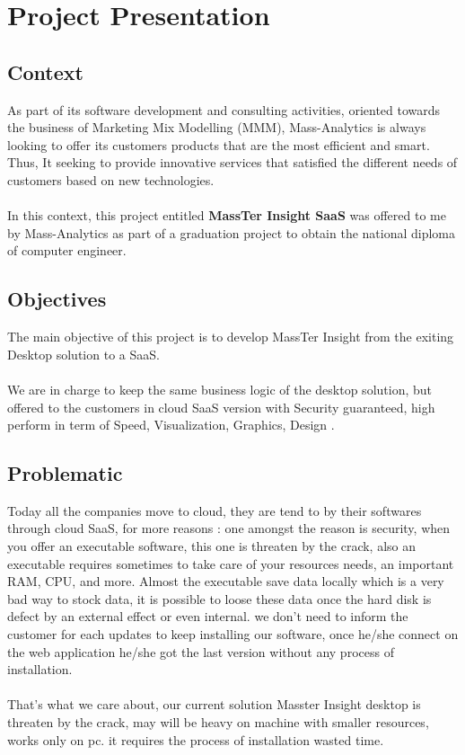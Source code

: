 	\section{Project Presentation}
	
	\subsection{Context}
	As part of its software development and consulting activities, oriented towards the business of Marketing Mix Modelling (MMM), Mass-Analytics is always looking to offer its customers products that are the most efficient and smart. Thus, It seeking to provide innovative services that satisfied the different needs of customers based on new technologies.
	\\
	\\
	In this context, this project entitled \textbf{MassTer Insight SaaS} was offered to me by Mass-Analytics as part of a graduation project to obtain the national diploma of computer engineer.      
	\subsection{Objectives}
	The main objective of this project is to develop MassTer Insight from the exiting Desktop solution to a SaaS.
	\\
	\\
	We are in charge to keep the same business logic of the desktop solution, but offered to the customers in cloud SaaS version with Security guaranteed,  high perform in term of Speed, Visualization, Graphics, Design .
	\subsection{Problematic}
	Today all the companies move to cloud, they are tend to by their softwares through cloud SaaS, for more reasons : one amongst the reason is security, when you offer an executable software, this one is threaten by the crack, also an executable requires sometimes to take care of your resources needs, an important RAM, CPU, and more. Almost the executable save data locally which is a very bad way to stock data, it is possible to loose these data once the hard disk is defect by an external effect or even internal. we don't need to inform the customer for each updates to keep installing our software, once he/she connect on the web application he/she got the last version without any process of installation.  
	\\
	\\
	That's what we care about, our current solution Masster Insight desktop is threaten by the crack, may will be heavy on machine with smaller resources, works only on pc. it requires the process of installation wasted time.

